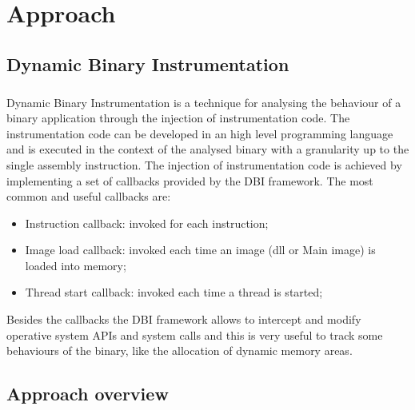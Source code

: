 \chapter{Approach}
\label{chapter3}
\thispagestyle{empty}

\section{Dynamic Binary Instrumentation}
\paragraph{}
Dynamic Binary Instrumentation is a technique for analysing the behaviour of a binary application through the injection of instrumentation code. The instrumentation code can be developed in an high level programming language and is executed in the context of the analysed binary with a granularity up to the single assembly instruction. The injection of instrumentation code is achieved by implementing a set of callbacks provided by the DBI framework. The most common and useful callbacks are:
\begin{itemize}
 \item Instruction callback: invoked for each instruction;
 \item Image load callback: invoked each time an image (dll or Main image) is loaded into memory;
  \item Thread start callback: invoked each time a thread is started;
\end{itemize}
Besides the callbacks the DBI framework allows to intercept and modify operative system APIs and system calls and this is very useful to track some behaviours of the binary, like the allocation of dynamic memory areas.


\section{Approach overview}
